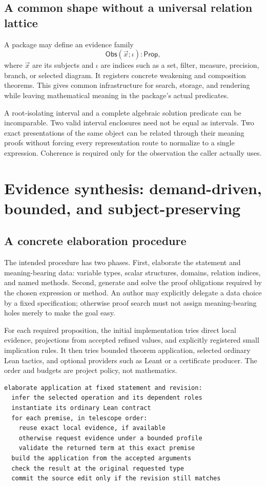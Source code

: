 \documentclass[11pt,a4paper]{article}
\newcommand{\Obs}{\mathsf{Obs}}
\theoremstyle{plain}
\theoremstyle{definition}
\theoremstyle{remark}
\begin{document}
\subsection{A common shape without a universal relation lattice}
A package may define an evidence family
\[
 \Obs(\vec x;\iota):\mathsf{Prop},
\]
where $\vec x$ are its subjects and $\iota$ are indices such as a set, filter,
measure, precision, branch, or selected diagram. It registers concrete
weakening and composition theorems. This gives common infrastructure for
search, storage, and rendering while leaving mathematical meaning in the
package's actual predicates.

A root-isolating interval and a complete algebraic solution predicate can be
incomparable. Two valid interval enclosures need not be equal as intervals.
Two exact presentations of the same object can be related through their
meaning proofs without forcing every representation route to normalize to a
single expression. Coherence is required only for the observation the caller
actually uses.

\section{Evidence synthesis: demand-driven, bounded, and subject-preserving}
\label{sec:synthesis}
\subsection{A concrete elaboration procedure}
The intended procedure has two phases. First, elaborate the statement and
meaning-bearing data: variable types, scalar structures, domains, relation
indices, and named methods. Second, generate and solve the proof obligations
required by the chosen expression or method. An author may explicitly delegate
a data choice by a fixed specification; otherwise proof search must not assign
meaning-bearing holes merely to make the goal easy.

For each required proposition, the initial implementation tries direct local
evidence, projections from accepted refined values, and explicitly registered
small implication rules. It then tries bounded theorem application, selected
ordinary Lean tactics, and optional providers such as Leant or a certificate
producer. The order and budgets are project policy, not mathematics.

\par\noindent\begin{minipage}{\linewidth}
\begin{lstlisting}
elaborate application at fixed statement and revision:
  infer the selected operation and its dependent roles
  instantiate its ordinary Lean contract
  for each premise, in telescope order:
    reuse exact local evidence, if available
    otherwise request evidence under a bounded profile
    validate the returned term at this exact premise
  build the application from the accepted arguments
  check the result at the original requested type
  commit the source edit only if the revision still matches
\end{lstlisting}
\end{minipage}\par
\end{document}
